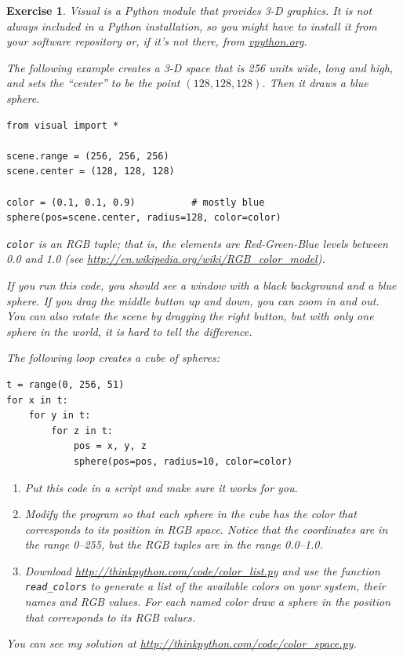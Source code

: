 \documentclass[12pt,a4paper,final,twoside,onecolumn,titlepage]{book}
\newtheorem{exercise}{Exercise}[chapter]
\begin{document}
\begin{exercise}

Visual is a Python module that provides 3-D graphics.  It is
not always included in a Python installation, so you might have
to install it from your software repository or, if it's not there,
from \url{vpython.org}.

The following example creates a 3-D space that is 256 units
wide, long and high, and sets the ``center'' to be the
point $(128,128,128)$.  Then it draws a blue sphere.

\begin{verbatim}
from visual import *

scene.range = (256, 256, 256)
scene.center = (128, 128, 128)

color = (0.1, 0.1, 0.9)          # mostly blue
sphere(pos=scene.center, radius=128, color=color)
\end{verbatim}

{\tt color} is an RGB tuple; that is, the elements are Red-Green-Blue
levels between 0.0 and 1.0 (see
\url{http://en.wikipedia.org/wiki/RGB_color_model}).

If you run this code, you should see a window with a black
background and a blue sphere.  If you drag the middle button
up and down, you can zoom in and out.  You can also rotate
the scene by dragging the right button, but with only one
sphere in the world, it is hard to tell the difference.

The following loop creates a cube of spheres:

\begin{verbatim}
t = range(0, 256, 51)
for x in t:
    for y in t:
        for z in t:
            pos = x, y, z
            sphere(pos=pos, radius=10, color=color)
\end{verbatim}

\begin{enumerate}

\item Put this code in a script and make sure it works for
you.

\item Modify the program so that each sphere in the cube
has the color that corresponds to its position in RGB space.
Notice that the coordinates are in the range 0--255, but
the RGB tuples are in the range 0.0--1.0.

\item Download \url{http://thinkpython.com/code/color_list.py}
and use the function \verb"read_colors" to generate a list
of the available colors on your system, their names and
RGB values.  For each named color draw a sphere in the
position that corresponds to its RGB values.



\end{enumerate}

You can see my solution at \url{http://thinkpython.com/code/color_space.py}.

\end{exercise}
\end{document}

